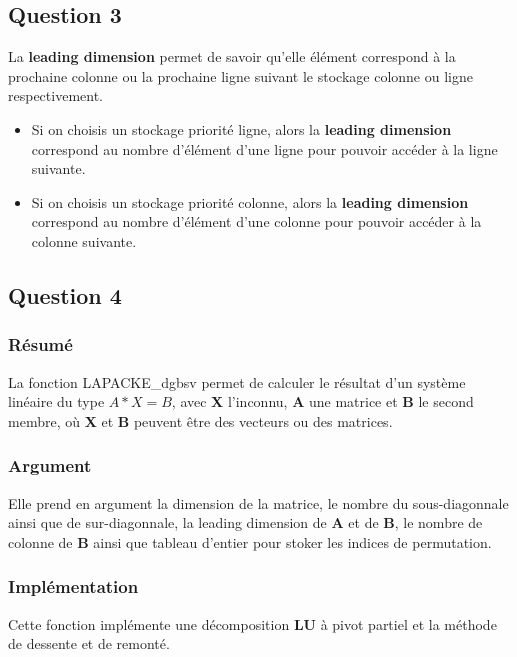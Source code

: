 \documentclass[11pt]{article}
\begin{document}
\subsection{Question 3}
   
La \textbf{leading dimension} permet de savoir qu'elle élément correspond
à la prochaine colonne ou la prochaine ligne suivant le stockage
colonne ou ligne respectivement.

\begin{itemize}
\item Si on choisis un stockage priorité ligne, alors la \textbf{leading dimension}
  correspond au nombre d'élément d'une ligne pour
  pouvoir accéder à la ligne suivante.
\item Si on choisis un stockage priorité colonne, alors la \textbf{leading dimension}
  correspond au nombre d'élément d'une colonne pour
  pouvoir accéder à la colonne suivante.
\end{itemize}

\subsection{Question 4}
\subsubsection{Résumé}

La fonction LAPACKE\_dgbsv permet de calculer le résultat d'un
système linéaire du type $A * X = B$, avec \textbf{X} l'inconnu, \textbf{A} une
matrice et \textbf{B} le second membre, où \textbf{X} et \textbf{B} peuvent être des
vecteurs ou des matrices.

\subsubsection{Argument}

Elle prend en argument la dimension de la matrice, le nombre du
sous-diagonnale ainsi que de sur-diagonnale, la leading dimension de
\textbf{A} et de \textbf{B}, le nombre de colonne de \textbf{B} ainsi
que tableau d'entier pour stoker les indices de permutation.

\subsubsection{Implémentation}

Cette fonction implémente une décomposition \textbf{LU} à pivot partiel et
la méthode de dessente et de remonté.
\end{document}
